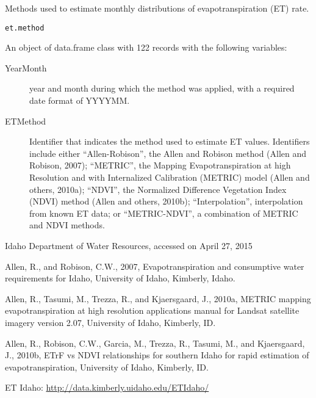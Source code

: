 \documentclass[a4paper]{book}
\begin{document}
%
\begin{Description}\relax
Methods used to estimate monthly distributions of evapotranspiration (ET) rate.
\end{Description}
%
\begin{Usage}
\begin{verbatim}
et.method
\end{verbatim}
\end{Usage}
%
\begin{Format}
An object of data.frame class with 122 records with the following variables:
\begin{description}

\item[YearMonth] year and month during which the method was applied,
with a required date format of YYYYMM.
\item[ETMethod] Identifier that indicates the method used to estimate ET values.
Identifiers include either
``Allen-Robison'', the Allen and Robison method (Allen and Robison, 2007);
``METRIC'', the Mapping Evapotranspiration at high Resolution and with
Internalized Calibration (METRIC) model (Allen and others, 2010a);
``NDVI'', the Normalized Difference Vegetation Index (NDVI) method
(Allen and others, 2010b);
``Interpolation'', interpolation from known ET data; or
``METRIC-NDVI'', a combination of METRIC and NDVI methods.

\end{description}

\end{Format}
%
\begin{Source}\relax
Idaho Department of Water Resources, accessed on April 27, 2015
\end{Source}
%
\begin{References}\relax
Allen, R., and Robison, C.W., 2007, Evapotranspiration and
consumptive water requirements for Idaho, University of Idaho, Kimberly, Idaho.

Allen, R., Tasumi, M., Trezza, R., and Kjaersgaard, J., 2010a,
METRIC mapping evapotranspiration at high resolution applications manual for
Landsat satellite imagery version 2.07, University of Idaho, Kimberly, ID.

Allen, R., Robison, C.W., Garcia, M., Trezza, R., Tasumi, M., and Kjaersgaard, J., 2010b,
ETrF vs NDVI relationships for southern Idaho for rapid estimation of evapotranspiration,
University of Idaho, Kimberly, ID.

ET Idaho: \url{http://data.kimberly.uidaho.edu/ETIdaho/}
\end{References}
\end{document}
